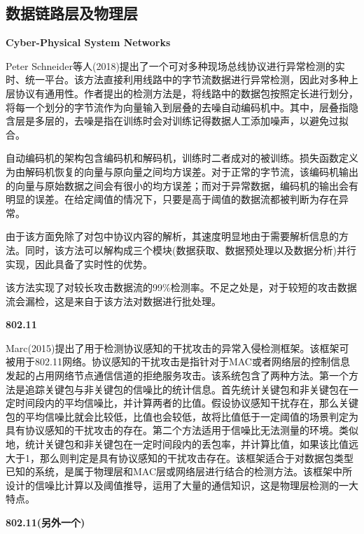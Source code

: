 \documentclass[11pt]{article} %
\begin{document}
\subsection{数据链路层及物理层}
\label{phy}

\textbf{Cyber-Physical System Networks}

Peter Schneider等人(2018)提出了一个可对多种现场总线协议进行异常检测的实时、统一平台。该方法直接利用线路中的字节流数据进行异常检测，因此对多种上层协议有通用性。作者提出的检测方法是，将线路中的数据包按照定长进行划分，将每一个划分的字节流作为向量输入到层叠的去噪自动编码机中。其中，层叠指隐含层是多层的，去噪是指在训练时会对训练记得数据人工添加噪声，以避免过拟合。

自动编码机的架构包含编码机和解码机，训练时二者成对的被训练。损失函数定义为由解码机恢复的向量与原向量之间均方误差。对于正常的字节流，该编码机输出的向量与原始数据之间会有很小的均方误差；而对于异常数据，编码机的输出会有明显的误差。在给定阈值的情况下，只要是高于阈值的数据流都被判断为存在异常。

由于该方面免除了对包中协议内容的解析，其速度明显地由于需要解析信息的方法。同时，该方法可以解构成三个模块(数据获取、数据预处理以及数据分析)并行实现，因此具备了实时性的优势。

该方法实现了对较长攻击数据流的99\%检测率。不足之处是，对于较短的攻击数据流会漏检，这是来自于该方法对数据进行批处理。

\textbf{802.11}

Marc(2015)提出了用于检测协议感知的干扰攻击的异常入侵检测框架。该框架可被用于802.11网络。协议感知的干扰攻击是指针对于MAC或者网络层的控制信息发起的占用网络节点通信信道的拒绝服务攻击。该系统包含了两种方法。第一个方法是追踪关键包与非关键包的信噪比的统计信息。首先统计关键包和非关键包在一定时间段内的平均信噪比，并计算两者的比值。假设协议感知干扰存在，那么关键包的平均信噪比就会比较低，比值也会较低，故将比值低于一定阈值的场景判定为具有协议感知的干扰攻击的存在。第二个方法适用于信噪比无法测量的环境。类似地，统计关键包和非关键包在一定时间段内的丢包率，并计算比值，如果该比值远大于1，那么则判定是具有协议感知的干扰攻击存在。该框架适合于对数据包类型已知的系统，是属于物理层和MAC层或网络层进行结合的检测方法。该框架中所设计的信噪比计算以及阈值推导，运用了大量的通信知识，这是物理层检测的一大特点。

\textbf{802.11(另外一个)}
\end{document}
